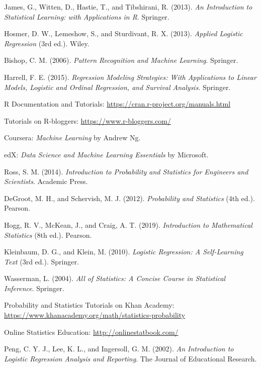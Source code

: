 \begin{thebibliography}{99}

James, G., Witten, D., Hastie, T., and Tibshirani, R. (2013). \textit{An Introduction to Statistical Learning: with Applications in R}. Springer.

Hosmer, D. W., Lemeshow, S., and Sturdivant, R. X. (2013). \textit{Applied Logistic Regression} (3rd ed.). Wiley.

Bishop, C. M. (2006). \textit{Pattern Recognition and Machine Learning}. Springer.

Harrell, F. E. (2015). \textit{Regression Modeling Strategies: With Applications to Linear Models, Logistic and Ordinal Regression, and Survival Analysis}. Springer.

R Documentation and Tutorials: \url{https://cran.r-project.org/manuals.html}

Tutorials on R-bloggers: \url{https://www.r-bloggers.com/}

Coursera: \textit{Machine Learning} by Andrew Ng.

edX: \textit{Data Science and Machine Learning Essentials} by Microsoft.

Ross, S. M. (2014). \textit{Introduction to Probability and Statistics for Engineers and Scientists}. Academic Press.

DeGroot, M. H., and Schervish, M. J. (2012). \textit{Probability and Statistics} (4th ed.). Pearson.

Hogg, R. V., McKean, J., and Craig, A. T. (2019). \textit{Introduction to Mathematical Statistics} (8th ed.). Pearson.

Kleinbaum, D. G., and Klein, M. (2010). \textit{Logistic Regression: A Self-Learning Text} (3rd ed.). Springer.

Wasserman, L. (2004). \textit{All of Statistics: A Concise Course in Statistical Inference}. Springer.

Probability and Statistics Tutorials on Khan Academy: \url{https://www.khanacademy.org/math/statistics-probability}

Online Statistics Education: \url{http://onlinestatbook.com/}

Peng, C. Y. J., Lee, K. L., and Ingersoll, G. M. (2002). \textit{An Introduction to Logistic Regression Analysis and Reporting}. The Journal of Educational Research.


\end{thebibliography}
